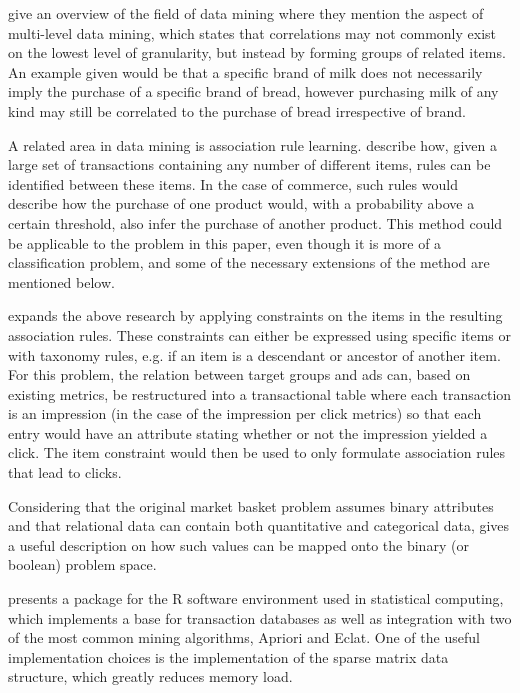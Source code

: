 \documentclass[10pt,twocolumn]{article}
\begin{document}
\citet{Chen1996} give an overview of the field of data mining where they mention the aspect of multi-level data mining, which states that correlations may not commonly exist on the lowest level of granularity, but instead by forming groups of related items. An example given would be that a specific brand of milk does not necessarily imply the purchase of a specific brand of bread, however purchasing milk of any kind may still be correlated to the purchase of bread irrespective of brand.

A related area in data mining is association rule learning. \citet{Agrawal1993} describe how, given a large set of transactions containing any number of different items, rules can be identified between these items. In the case of commerce, such rules would describe how the purchase of one product would, with a probability above a certain threshold, also infer the purchase of another product. This method could be applicable to the problem in this paper, even though it is more of a classification problem, and some of the necessary extensions of the method are mentioned below.

\citet{Srikant1997} expands the above research by applying constraints on the items in the resulting association rules. These constraints can either be expressed using specific items or with taxonomy rules, e.g. if an item is a descendant or ancestor of another item. For this problem, the relation between target groups and ads can, based on existing metrics, be restructured into a transactional table where each transaction is an impression (in the case of the impression per click metrics) so that each entry would have an attribute stating whether or not the impression yielded a click. The item constraint would then be used to only formulate association rules that lead to clicks.

Considering that the original market basket problem assumes binary attributes and that relational data can contain both quantitative and categorical data, \citep{Srikant1996} gives a useful description on how such values can be mapped onto the binary (or boolean) problem space.

\citet{Hahsler2007} presents a package for the R software environment used in statistical computing, which implements a base for transaction databases as well as integration with two of the most common mining algorithms, Apriori and Eclat. One of the useful implementation choices is the implementation of the sparse matrix data structure, which greatly reduces memory load.
\end{document}
